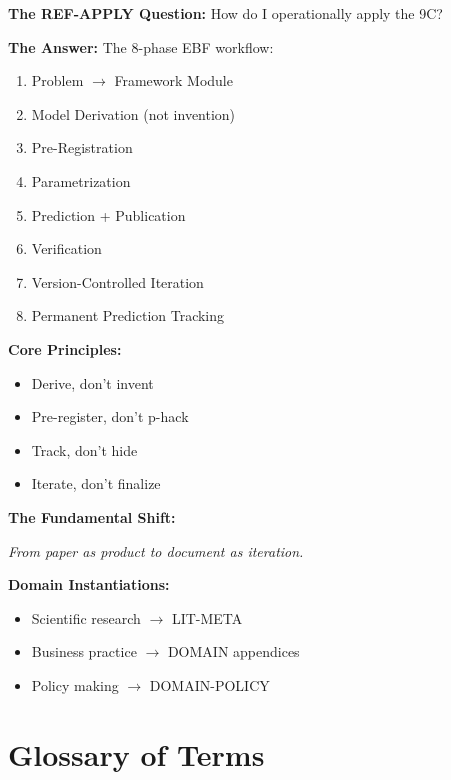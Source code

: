\begin{tcolorbox}[colback=green!5!white, colframe=green!75!black,
    title=\textbf{REF-APPLY Summary}]

\textbf{The REF-APPLY Question:} How do I operationally apply the 9C?

\textbf{The Answer:} The 8-phase EBF workflow:
\begin{enumerate}[nosep]
    \item Problem $\to$ Framework Module
    \item Model Derivation (not invention)
    \item Pre-Registration
    \item Parametrization
    \item Prediction + Publication
    \item Verification
    \item Version-Controlled Iteration
    \item Permanent Prediction Tracking
\end{enumerate}

\textbf{Core Principles:}
\begin{itemize}[nosep]
    \item Derive, don't invent
    \item Pre-register, don't p-hack
    \item Track, don't hide
    \item Iterate, don't finalize
\end{itemize}

\textbf{The Fundamental Shift:}
\begin{center}
\textit{From paper as product to document as iteration.}
\end{center}

\textbf{Domain Instantiations:}
\begin{itemize}[nosep]
    \item Scientific research $\to$ LIT-META
    \item Business practice $\to$ DOMAIN appendices
    \item Policy making $\to$ DOMAIN-POLICY
\end{itemize}

\end{tcolorbox}



\section{Glossary of Terms}
\label{sec:apply-glossary}

